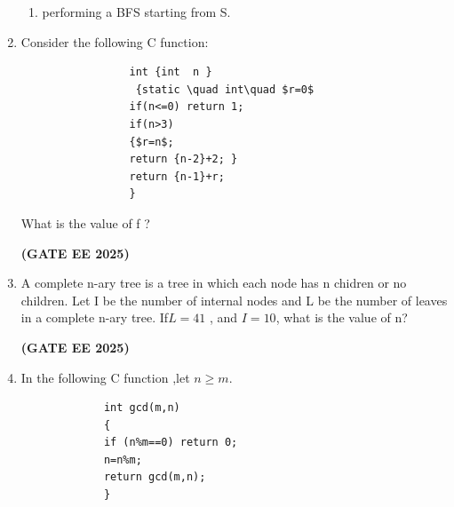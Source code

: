 \documentclass[journal,12pt,onecolumn]{IEEEtran}
\theoremstyle{remark}
\begin{document}
\begin{enumerate}
\begin{enumerate}
                 \item  performing a BFS starting from S.
                 \end{enumerate}
                 \item Consider the following C function:
                 \begin{verbatim}
                 int {int  n }
                  {static \quad int\quad $r=0$
                 if(n<=0) return 1;
                 if(n>3)
                 {$r=n$;
                 return {n-2}+2; }
                 return {n-1}+r;
                 }
                 \end{verbatim}
                 
                 
             
       
        
         What is the value of f ?
         \begin{enumerate}
         \end{enumerate}
         \hfill \textbf{(GATE EE 2025)}
         \item A complete n-ary tree  is a tree in which each node has n chidren or no children. Let I be the number of internal nodes and L be the number of leaves in a complete n-ary tree. If$L=41$ , and $I=10$, what is the value of n?
         \begin{enumerate}
         \end{enumerate}
         \hfill \textbf{(GATE EE 2025)}
         \item In  the  following C function ,let $n\geq m$.
         \begin{verbatim}
             int gcd(m,n)
             {
             if (n%m==0) return 0;
             n=n%m;
             return gcd(m,n);  
             }
         \end{verbatim}
         \begin{enumerate}
         \begin{multicols}{4}
             

\end{multicols}
\end{enumerate}
\end{enumerate}
\end{document}

